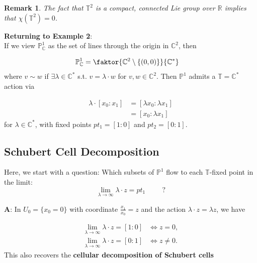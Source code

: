 \documentclass{amsart}
\newtheorem{remark}[theorem]{Remark}
\newcommand{\R}{\mathbb{R}}
\newcommand{\PP}{\mathbb{P}}\newcommand{\A}{\mathbb{A}}\newcommand{\Z}{\mathbb{Z}}\newcommand{\C}{\mathbb{C}}\newcommand{\N}{\mathbb{N}}\newcommand{\T}{\mathbb{T}}
\begin{document}
\begin{remark} The fact that $\T^2$ is a compact, connected Lie group over $\R$ implies that $\chi(\T^2)=0$. \end{remark} 



\textbf{Returning to Example 2}:\\

If we view $\PP^1_\C$ as the set of lines through the origin in $\C^2$, then 

\begin{align*} 
    \PP^1_\C &= \faktor{\C^2 \setminus \{(0,0)\} }{\C^*}
\end{align*} where $v \sim w$ if $\exists \lambda\in \C^*$ s.t. $v = \lambda \cdot w$ for $v,w\in \C^2$. Then $\PP^1$ admits a $\T=\C^*$ action via

\begin{align*}
    \lambda\cdot [x_0:x_1] &= [\lambda x_0: \lambda x_1] \\
    &= [x_0: \lambda x_1]
\end{align*} for $\lambda \in \C^*$, with fixed points $pt_1 = [1:0]$ and $pt_2=[0:1]$. \\

\subsection{Schubert Cell Decomposition}
\label{schubcell}

Here, we start with a question: Which subsets of $\PP^1$ flow to each $\T$-fixed point in the limit: \[ \lim_{\lambda \rightarrow \infty} \lambda \cdot z = pt_1  \hspace{1cm} ?\] 


\textbf{A}: In $U_0 = \{x_0=0\}$ with coordinate $\frac{x_1}{x_0}=z$ and the action $\lambda \cdot z = \lambda z$, we have

\begin{align*}
    \lim_{\lambda\rightarrow \infty} \lambda \cdot z = [1:0] &\iff z=0 ,\\
    \lim_{\lambda \rightarrow \infty} \lambda \cdot z = [0:1] &\iff z\neq 0. 
\end{align*} This also recovers the \textbf{cellular decomposition of Schubert cells} 
\end{document}
